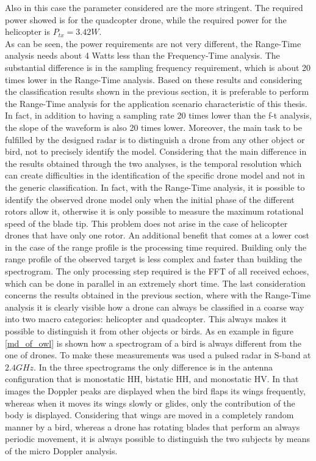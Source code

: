 Also in this case the parameter considered are the more stringent. The required power showed is for the quadcopter drone, while the required power for the helicopter is $P_{tx} = 3.42 W$.\\
As can be seen, the power requirements are not very different, the Range-Time analysis needs about 4 Watts less than the Frequency-Time analysis. The substantial difference is in the sampling frequency requirement, which is about 20 times lower in the Range-Time analysis. Based on these results and considering the classification results shown in the previous section, it is preferable to perform the Range-Time analysis for the application scenario characteristic of this thesis. In fact, in addition to having a sampling rate 20 times lower than the f-t analysis, the slope of the waveform is also 20 times lower. Moreover, the main task to be fulfilled by the designed radar is to distinguish a drone from any other object or bird, not to precisely identify the model. Considering that the main difference in the results obtained through the two analyses, is the temporal resolution which can create difficulties in the identification of the specific drone model and not in the generic classification. In fact, with the Range-Time analysis, it is possible to identify the observed drone model only when the initial phase of the different rotors allow it, otherwise it is only possible to measure the maximum rotational speed of the blade tip. This problem does not arise in the case of helicopter drones that have only one rotor. An additional benefit that comes at a lower cost in the case of the range profile is the processing time required. Building only the range profile of the observed target is less complex and faster than building the spectrogram. The only processing step required is the FFT of all received echoes, which can be done in parallel in an extremely short time. The last consideration concerns the results obtained in the previous section, where with the Range-Time analysis it is clearly visible how a drone can always be classified in a coarse way into two macro categories: helicopter and quadcopter. This always makes it possible to distinguish it from other objects or birds. As en example in figure \ref{md_of_owl} is shown how a spectrogram of a bird is always different from the one of drones. To make these measurements was used a pulsed radar in S-band at $2.4 GHz$. In the three spectrograms the only difference is in the antenna configuration that is monostatic HH, bistatic HH, and monostatic HV. In that images the Doppler peaks are displayed when the bird flaps its wings frequently, whereas when it moves its wings slowly or glides, only the contribution of the body is displayed. Considering that wings are moved in a completely random manner by a bird, whereas a drone has rotating blades that perform an always periodic movement, it is always possible to distinguish the two subjects by means of the micro Doppler analysis.
 
